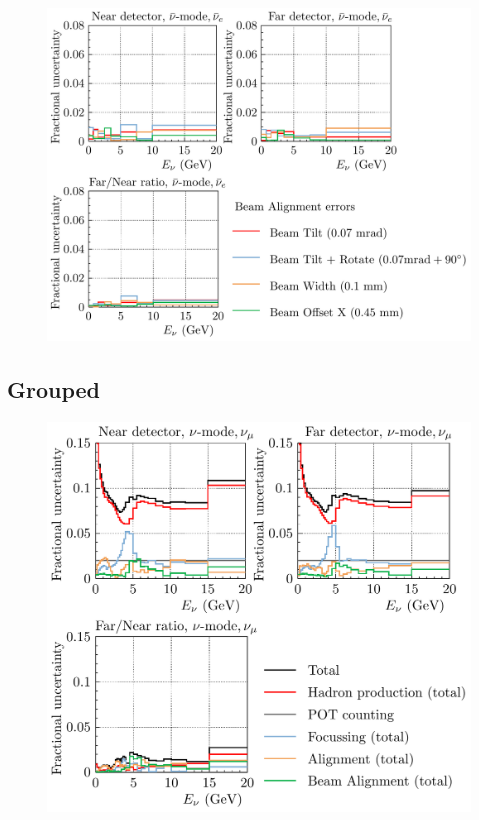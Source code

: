 \documentclass{article}
\begin{document}
\begin{figure}
  \includegraphics[width=\textwidth]{plots/fracerrs/nubarmode_nuebar_BeamAlignment}
  \caption{}
  \label{fig:beamalign_nubar_nuebar}
\end{figure}

\subsection{Grouped}

\begin{figure}
  \includegraphics[width=\textwidth]{plots/fracerrs/numode_numu_ErrType}
  \caption{}
  \label{fig:grp_nu_numu}
\end{figure}
\end{document}
